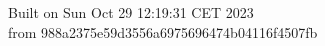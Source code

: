 {\noindent Built on Sun Oct 29 12:19:31 CET 2023} \\ 
 {\noindent from 988a2375e59d3556a6975696474b04116f4507fb}
